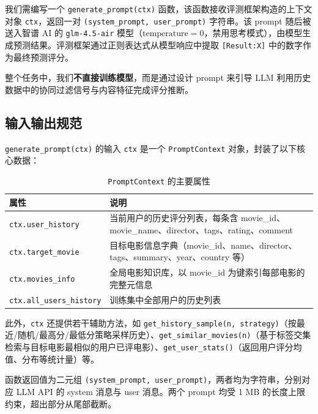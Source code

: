 \documentclass[UTF8,a4paper,10pt]{ctexart}
\begin{document}
我们需编写一个 \texttt{generate\_prompt(ctx)} 函数，该函数接收评测框架构造的上下文对象 \texttt{ctx}，返回一对 \texttt{(system\_prompt, user\_prompt)} 字符串。该 prompt 随后被送入智谱 AI 的 \texttt{glm-4.5-air} 模型（$\text{temperature}=0$，禁用思考模式），由模型生成预测结果。评测框架通过正则表达式从模型响应中提取 \texttt{[Result:X]} 中的数字作为最终预测评分。

整个任务中，我们\textbf{不直接训练模型}，而是通过设计 prompt 来引导 LLM 利用历史数据中的协同过滤信号与内容特征完成评分推断。

\subsection{输入输出规范}

\texttt{generate\_prompt(ctx)} 的输入 \texttt{ctx} 是一个 \texttt{PromptContext} 对象，封装了以下核心数据：

\begin{table}[htbp]
    \centering
    \setlength{\tabcolsep}{8pt}
    \caption{\texttt{PromptContext} 的主要属性}
    \label{tab:ctx}
    \small
    \begin{tabular}{@{}p{}p{}@{}}
        \toprule
        \textbf{属性} & \textbf{说明} \\
        \midrule
        \texttt{ctx.user\_history} & 当前用户的历史评分列表，每条含 movie\_id、movie\_name、director、tags、rating、comment \\
        \texttt{ctx.target\_movie}  & 目标电影信息字典（movie\_id、name、director、tags、summary、year、country 等） \\
        \texttt{ctx.movies\_info}   & 全局电影知识库，以 movie\_id 为键索引每部电影的完整元信息 \\
        \texttt{ctx.all\_users\_history} & 训练集中全部用户的历史列表 \\
        \bottomrule
    \end{tabular}
\end{table}

此外，\texttt{ctx} 还提供若干辅助方法，如 \texttt{get\_history\_sample(n, strategy)}（按最近/随机/最高分/最低分策略采样历史）、\texttt{get\_similar\_movies(n)}（基于标签交集检索与目标电影最相似的用户已评电影）、\texttt{get\_user\_stats()}（返回用户评分均值、分布等统计量）等。

函数返回值为二元组 \texttt{(system\_prompt, user\_prompt)}，两者均为字符串，分别对应 LLM API 的 system 消息与 user 消息。两个 prompt 均受 1 MB 的长度上限约束，超出部分从尾部截断。
\end{document}
